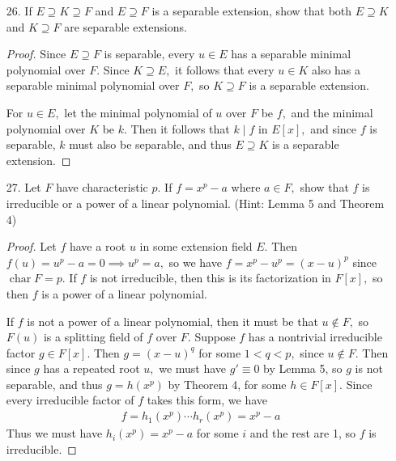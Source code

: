 \documentclass{article}
\DeclareMathOperator{\cha}{char}
\begin{document}
\begin{itemize}
	\item[26.] If $E\supseteq K\supseteq F$ and $E\supseteq F$ is a separable extension, show that both $E\supseteq K$ and $K\supseteq F$ are separable extensions.
		\begin{proof}
			Since $E\supseteq F$ is separable, every $u\in E$ has a separable minimal polynomial over $F.$ Since $K\supseteq E,$ it follows that every $u\in K$ also has a separable minimal polynomial over $F,$ so $K\supseteq F$ is a separable extension. 
			
			For $u\in E,$ let the minimal polynomial of $u$ over $F$ be $f,$ and the minimal polynomial over $K$ be $k.$ Then it follows that $k\mid f$ in $E[x],$ and since $f$ is separable, $k$ must also be separable, and thus $E\supseteq K$ is a separable extension.
		\end{proof}

	\item[27.] Let $F$ have characteristic $p.$ If $f=x^p-a$ where $a\in F,$ show that $f$ is irreducible or a power of a linear polynomial. (Hint: Lemma 5 and Theorem 4)
		\begin{proof}
			Let $f$ have a root $u$ in some extension field $E.$ Then $f(u)=u^p-a=0\implies u^p=a,$ so we have $f=x^p-u^p=(x-u)^p$ since $\cha F=p.$ If $f$ is not irreducible, then this is its factorization in $F[x],$ so then $f$ is a power of a linear polynomial.
			
			If $f$ is not a power of a linear polynomial, then it must be that $u\notin F,$ so $F(u)$ is a splitting field of $f$ over $F.$ Suppose $f$ has a nontrivial irreducible factor $g\in F[x].$ Then $g=(x-u)^q$ for some $1< q<p,$ since $u\notin F.$ Then since $g$ has a repeated root $u,$ we must have $g'\equiv0$ by Lemma 5, so $g$ is not separable, and thus $g=h(x^p)$ by Theorem 4, for some $h\in F[x].$ Since every irreducible factor of $f$ takes this form, we have
			\begin{align*}
				f = h_1(x^p) \cdots h_r (x^p)= x^p-a
			\end{align*}
			Thus we must have $h_i(x^p) = x^p-a$ for some $i$ and the rest are 1, so $f$ is irreducible. 
		\end{proof}
		
\end{itemize}
\end{document}
